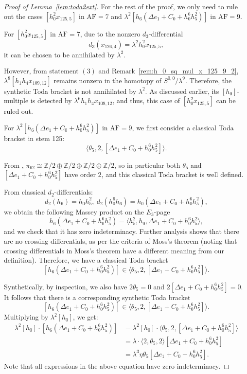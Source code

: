 \documentclass{amsart}
\numberwithin{equation}{section}
\newcommand{\AF}{\mathrm{AF}}
\begin{document}
\begin{proof}[Proof of Lemma~\ref{lem:toda2ext}]
For the rest of the proof, we only need to rule out the cases $[h_0^2 x_{125,5}]$ in $\AF=7$ and $\lambda^2 [h_6(\Delta e_1 +C_0+h_0^6h_5^2)]$ in $\AF=9$. 

For $[h_0^2 x_{125,5}]$ in $\AF=7$, due to the nonzero $d_3$-differential
$$d_3(x_{126,4}) = \lambda^2 h_0^2 x_{125,5},$$
it can be chosen to be annihilated by $\lambda^2$. 

However, from statement $(3)$ and Remark~\ref{rem:h_0_sq_mul_x_125_9_2}, $\lambda^8 [h_1h_4x_{109,12}]$ remains nonzero in the homotopy of $S^{0,0}/\lambda^9$. Therefore, the synthetic Toda bracket is not annihilated by $\lambda^2$. As discussed earlier, its $[h_0]$-multiple is detected by $\lambda^6 h_1h_4x_{109,12}$, and thus, this case of $[h_0^2 x_{125,5}]$ can be ruled out.



For $\lambda^2 [h_6(\Delta e_1 +C_0+h_0^6h_5^2)]$ in $\AF=9$, we first consider a classical Toda bracket in stem 125:
$$\langle \theta_5, 2, [\Delta e_1 +C_0+h_0^6h_5^2] \rangle.$$

From \cite{Xu, IWX}, $\pi_{62} \cong \mathbb{Z}/2 \oplus \mathbb{Z}/2 \oplus \mathbb{Z}/2 \oplus \mathbb{Z}/2$, so in particular both $\theta_5$ and $[\Delta e_1 +C_0+h_0^6h_5^2]$ have order 2, and this classical Toda bracket is well defined.

From classical $d_2$-differentials:
$$d_2(h_6) = h_0h_5^2, \ d_2(h_0^6h_6)= h_0(\Delta e_1 +C_0+h_0^6h_5^2),$$
we obtain the following Massey product on the $E_3$-page
$$h_6(\Delta e_1 +C_0+h_0^6h_5^2) = \langle h_5^2, h_0, \Delta e_1 +C_0+h_0^6h_5^2 \rangle,$$
and we check that it has zero indeterminacy. Further analysis shows that there are no crossing differentials, as per the criteria of Moss's theorem \cite[Theorem~1.2]{Moss} (noting that crossing differentials in Moss's theorem have a different meaning from our definition). Therefore, we have a classical Toda bracket 
$$[h_6(\Delta e_1 +C_0+h_0^6h_5^2)] \in \langle \theta_5, 2, [\Delta e_1 +C_0+h_0^6h_5^2] \rangle.$$

Synthetically, by inspection, we also have $2\theta_5=0$ and $2 [\Delta e_1 +C_0+h_0^6h_5^2] = 0$. It follows that there is a corresponding synthetic Toda bracket
$$[h_6(\Delta e_1 +C_0+h_0^6h_5^2)] \in \langle \theta_5, 2, [\Delta e_1 +C_0+h_0^6h_5^2] \rangle.$$
Multiplying by $\lambda^2 [h_0]$, we get:
\begin{align*}
    \lambda^2 [h_0] \cdot [h_6(\Delta e_1 +C_0+h_0^6h_5^2)]& = \lambda^2 [h_0] \cdot \langle \theta_5, 2, [\Delta e_1 +C_0+h_0^6h_5^2] \rangle \\
    & = \lambda \cdot \langle 2, \theta_5, 2 \rangle [\Delta e_1 +C_0+h_0^6h_5^2]\\
    & = \lambda^3 \eta \theta_5 [\Delta e_1 +C_0+h_0^6h_5^2].
\end{align*}
Note that all expressions in the above equation have zero indeterminacy. 


\end{proof}
\end{document}
